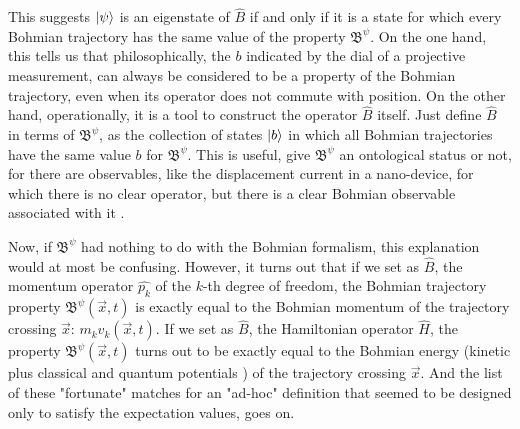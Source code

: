 \documentclass[11pt, a4paper]{article} %
\newcommand{\B}{\mathfrak{B}}
\begin{document}
This suggests $\ket{\psi}$ is an eigenstate of $\hat{B}$ if and only if it is a state for which every Bohmian trajectory has the same value of the property $\B^\psi$. On the one hand, this tells us that philosophically, the $b$ indicated by the dial of a projective measurement, can always be considered to be a property of the Bohmian trajectory, even when its operator does not commute with position. On the other hand, operationally, it is a tool to construct the operator $\hat{B}$ itself. Just define $\hat{B}$ in terms of $\B^\psi$, as the collection of states $\ket{b}$ in which all Bohmian trajectories have the same value $b$ for $\B^\psi$. This is useful, give $\B^\psi$ an ontological status or not, for there are observables, like the displacement current in a nano-device, for which there is no clear operator, but there is a clear Bohmian observable associated with it \cite{Pel, equiv}.

Now, if $\B^\psi$ had nothing to do with the Bohmian formalism, this explanation would at most be confusing. However, it turns out \cite{DevInPosition1} that if we set as $\hat{B}$, the momentum operator $\hat{p_k}$ of the $k$-th degree of freedom, the Bohmian trajectory property $\B^\psi(\vec{x},t)$ is exactly equal to the Bohmian momentum of the trajectory crossing $\vec{x}$: $m_k v_k(\vec{x},t)$. If we set as $\hat{B}$, the Hamiltonian operator $\hat{H}$, the property $\B^\psi(\vec{x},t)$ turns out to be exactly equal to the Bohmian energy (kinetic plus classical and quantum potentials \cite{JordiXavier}) of the trajectory crossing $\vec{x}$. And the list of these "fortunate" matches for an "ad-hoc" definition that seemed to be designed only to satisfy the expectation values, goes on. %
\end{document}
